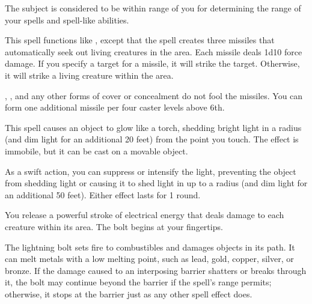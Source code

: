 \spellrng{\rngfar}
\begin{spelleffect}
  The subject is considered to be within \rngclose range of you for determining the range of your spells and spell-like abilities.
\end{spelleffect}

\spellrng{\rngmed}
\begin{spelleffect}
  This spell functions like , except that the spell creates three missiles that automatically seek out living creatures in the area. Each missile deals 1d10 force damage. If you specify a target for a missile, it will strike the target. Otherwise, it will strike a living creature within the area.
  
  , , and any other forms of cover or concealment do not fool the missiles. You can form one additional missile per four caster levels above 6th.
\end{spelleffect}

\spellrng{\rngtouch}
\begin{spelleffect}
  This spell causes an object to glow like a torch, shedding bright light in a \areamed radius (and dim light for an additional 20 feet) from the point you touch. The effect is immobile, but it can be cast on a movable object.
  
  As a swift action, you can suppress or intensify the light, preventing the object from shedding light or causing it to shed light in up to a \arealarge radius (and dim light for an additional 50 feet). Either effect lasts for 1 round.
\end{spelleffect}

\begin{spelleffect}
  You release a powerful stroke of electrical energy that deals damage to each creature within its area. The bolt begins at your fingertips.
  \par The lightning bolt sets fire to combustibles and damages objects in its path. It can melt metals with a low melting point, such as lead, gold, copper, silver, or bronze. If the damage caused to an interposing barrier shatters or breaks through it, the bolt may continue beyond the barrier if the spell's range permits; otherwise, it stops at the barrier just as any other spell effect does.
\end{spelleffect}

